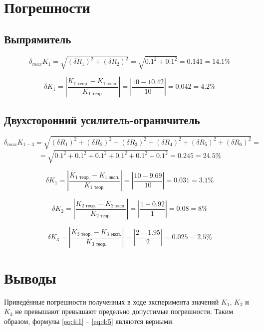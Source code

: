 \section{Погрешности}

\subsection{Выпрямитель}

\begin{displaymath}
	\delta_{max} K_1 = \sqrt{(\delta R_1)^2 + (\delta R_2)^2} = \sqrt{0.1^2 + 0.1^2} = 0.141 = 14.1 \%
\end{displaymath}

\begin{displaymath}
	\delta K_1 = \left| \frac{K_{1 \text{ теор.}} - K_{1 \text{ эксп.}}}{K_{1 \text{ теор.}}} \right| = \left| \frac{10 - 10.42}{10} \right| = 0.042 = 4.2 \%
\end{displaymath}

\subsection{Двухсторонний усилитель-ограничитель}

\begin{displaymath}
	\delta_{max} K_{1-3} = \sqrt{(\delta R_1)^2 + (\delta R_2)^2 + (\delta R_3)^2 + (\delta R_4)^2 + (\delta R_5)^2 + (\delta R_6)^2} = 
\end{displaymath}
\begin{displaymath}
	= \sqrt{0.1^2 + 0.1^2 + 0.1^2 + 0.1^2 + 0.1^2 + 0.1^2} = 0.245 = 24.5 \%
\end{displaymath}

\begin{displaymath}
	\delta K_1 = \left| \frac{K_{1 \text{ теор.}} - K_{1 \text{ эксп.}}}{K_{1 \text{ теор.}}} \right| = \left| \frac{10 - 9.69}{10} \right| = 0.031 = 3.1 \%
\end{displaymath}

\begin{displaymath}
	\delta K_2 = \left| \frac{K_{2 \text{ теор.}} - K_{2 \text{ эксп.}}}{K_{2 \text{ теор.}}} \right| = \left| \frac{1 - 0.92}{1} \right| = 0.08 = 8 \%
\end{displaymath}

\begin{displaymath}
	\delta K_3 = \left| \frac{K_{3 \text{ теор.}} - K_{3 \text{ эксп.}}}{K_{3 \text{ теор.}}} \right| = \left| \frac{2 - 1.95}{2} \right| = 0.025 = 2.5 \%
\end{displaymath}

\section{Выводы}

Приведённые погрешности полученных в ходе эксперимента значений $K_1$, $K_2$ и $K_3$ не превышают превышают предельно допустимые погрешности.
Таким образом, формулы \ref{eq:4:1} -- \ref{eq:4:5} являются верными.

